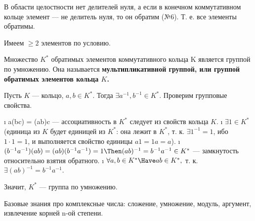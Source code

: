 \begin{solution}
В области целостности нет делителей нуля, а если в конечном коммутативном кольце элемент --- не делитель нуля, то он обратим (№6). Т. е. все элементы обратимы.

Имеем \(\ge 2\) элементов по условию.
\end{solution}

\begin{problem}[8]
Множество $K^*$ обратимых элементов коммутативного кольца K является группой по умножению. Она называется \bf{мультипликативной группой}, или \bf{группой обратимых элементов} кольца $K$.
\end{problem}

\begin{solution}
Пусть \(K\) --- кольцо, \(a, b \in K^*\). Тогда \(\exists a^{-1}, b^{-1} \in K^*\). Проверим групповые свойства.

\begin{enumerate}
\def\labelenumi{\arabic{enumi}.}
\tightlist
\i
  a(bc) = (ab)c --- ассоциативность в \(K^*\) следует из свойств кольца \(K\).
\i
  \(\exists 1 \in K^*\) (единица из $K$ будет единицей из $K^*$: она лежит в $K^*$, т. к. $\exists 1^{-1} = 1$, ибо $1\cdot 1 = 1$, и выполняется свойство единицы $a1=1a=a$).
\i
  \((b^{-1}a^{-1})(ab) = (ab)(b^{-1}a^{-1})=1 \Then (ab)^{-1} = b^{-1} a^{-1} \in K^*\) --- замкнутость относительно взятия обратного.
\i
  \(\forall a, b \in K^* \Have ab \in K^*,\) т. к. $\exists (ab)^{-1} = b^{-1}a^{-1}$.
\end{enumerate}

Значит, \(K^*\) --- группа по умножению.
\end{solution}

\begin{problem}[9(1.5-1.7)]
Базовые знания про комплексные числа: сложение, умножение, модуль, аргумент, извлечение корней n-ой степени.
\end{problem}

